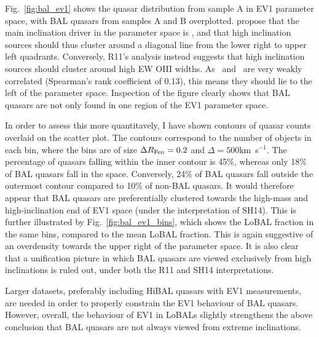 Fig.~\ref{fig:bal_ev1} shows the quasar distribution from sample A 
in EV1 parameter space, with BAL quasars from samples A and B overplotted.
\cite[][hereafter SH14]{shenho2014} propose 
that the main inclination driver in the parameter space
is \fwh, and that high inclination sources should thus cluster around
a diagonal line from the lower right to upper left quadrants. Conversely,
R11's analysis instead suggests that high inclination sources should cluster
around high EW OIII widths. As \ewo\ and \fwh\ are very weakly correlated
(Spearman's rank coefficient of 0.13), this means they should lie to
the left of the parameter space. Inspection of the figure clearly 
shows that BAL quasars are not only found in one region of the 
EV1 parameter space. 

In order to assess this more quantitavely, I have shown contours of 
quasar counts overlaid on the scatter plot. The contours correspond
to the number of objects in each bin, where the bins are of size
$\Delta R_{{\rm Fe \textsc{ii}}} = 0.2$ and $\Delta$\fwh$=500$km~s$^{-1}$.
The percentage of quasars falling within the inner contour is 45\%, 
whereas only 18\% of BAL quasars fall in the space. Conversely, 24\% 
of BAL quasars fall outside the outermost contour compared to 10\% of 
non-BAL quasars. It would therefore appear that BAL 
quasars are preferentially clustered towards the high-mass and 
high-inclination end of EV1 space (under the interpretation of SH14).
This is further illustrated by Fig.~\ref{fig:bal_ev1_bins},
which shows the LoBAL fraction in the same bins, compared to the 
mean LoBAL fraction. This is again suggestive of an overdensity 
towards the upper right of the parameter space.
It is also clear that a unification picture in which BAL 
quasars are viewed exclusively from high inclinations is ruled out,
under both the R11 and SH14 interpretations. 

Larger datasets, preferably including HiBAL quasars with EV1 measurements, 
are needed in order to properly constrain the EV1 behaviour of BAL quasars.
However, overall, the behaviour of EV1 in LoBALs slightly 
strengthens the above conclusion that BAL quasars are not always viewed from 
extreme inclinations.

